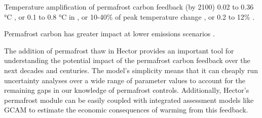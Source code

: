 \documentclass[essd, manuscript]{copernicus}
\begin{document}
Temperature amplification of permafrost carbon feedback (by 2100) 0.02 to 0.36 °C \citep{burke_2013_estimating, schneider-von-deimling_2012_estimating, schneider-von-deimling_2015_observation-based}, or 0.1 to 0.8 °C in \citep{macdougall_2012_significant, macdougall_2013_if}, or 10-40\% of peak temperature change \citep{crichton_2016_permafrost}, or 0.2 to 12\% \citep{burke_2017_quantifying}.

Permafrost carbon has greater impact at lower emissions scenarios \citep{burke_2017_quantifying, macdougall_2012_significant, macdougall_2013_if} .


\conclusions  %
The addition of permafrost thaw in Hector provides an important tool for understanding the potential impact of the permafrost carbon feedback over the next decades and centuries. The model’s simplicity means that it can cheaply run uncertainty analyses over a wide range of parameter values to account for the remaining gaps in our knowledge of permafrost controls. Additionally, Hector's permafrost module can be easily coupled with integrated assessment models like GCAM to estimate the economic consequences of warming from this feedback.















\end{document}
